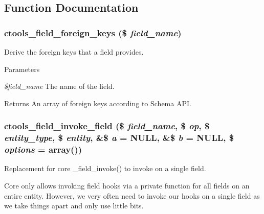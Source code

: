\subsection{Function Documentation}
\hypertarget{fields_8inc_a714c68e6faaf2f4918d726fb580e920e}{
\subsubsection[{ctools\_\-field\_\-foreign\_\-keys}]{\setlength{\rightskip}{0pt plus 5cm}ctools\_\-field\_\-foreign\_\-keys (\$ {\em field\_\-name})}}
\label{fields_8inc_a714c68e6faaf2f4918d726fb580e920e}
Derive the foreign keys that a field provides.


\begin{DoxyParams}{Parameters}
\item[{\em \$field\_\-name}]The name of the field.\end{DoxyParams}
\begin{DoxyReturn}{Returns}
An array of foreign keys according to Schema API. 
\end{DoxyReturn}
\hypertarget{fields_8inc_a109d8f80825dc8d999859e0d580ca8e5}{
\subsubsection[{ctools\_\-field\_\-invoke\_\-field}]{\setlength{\rightskip}{0pt plus 5cm}ctools\_\-field\_\-invoke\_\-field (\$ {\em field\_\-name}, \/  \$ {\em op}, \/  \$ {\em entity\_\-type}, \/  \$ {\em entity}, \/  \&\$ {\em a} = {\ttfamily NULL}, \/  \&\$ {\em b} = {\ttfamily NULL}, \/  \$ {\em options} = {\ttfamily array()})}}
\label{fields_8inc_a109d8f80825dc8d999859e0d580ca8e5}
Replacement for core \_\-field\_\-invoke() to invoke on a single field.

Core only allows invoking field hooks via a private function for all fields on an entire entity. However, we very often need to invoke our hooks on a single field as we take things apart and only use little bits.


